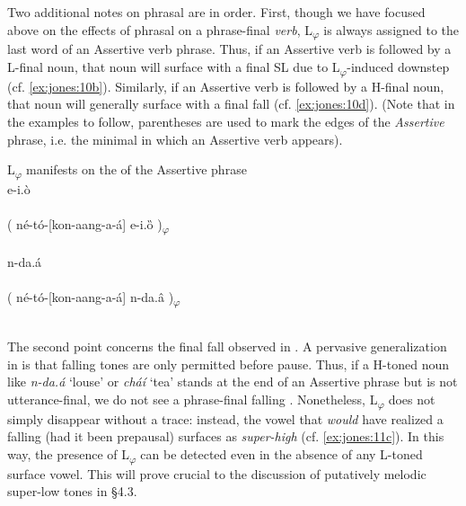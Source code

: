 \documentclass[output=paper
,newtxmath
,modfonts
,nonflat]{langsci/langscibook}
\begin{document}
Two additional notes on phrasal  are in order. First, though we have focused above on the effects of phrasal  on a phrase-final \textit{verb}, L\textsubscript{$\varphi $} is always assigned to the last word of an Assertive verb phrase. Thus, if an Assertive verb is followed by a L-final noun, that noun will surface with a final SL  due to L\textsubscript{$\varphi $}-induced downstep (cf. \ref{ex:jones:10b}). Similarly, if an Assertive verb is followed by a H-final noun, that noun will generally surface with a final fall (cf. \ref{ex:jones:10d}). (Note that in the examples to follow, parentheses are used to mark the edges of the \textit{Assertive} phrase, i.e. the minimal  in which an Assertive verb appears).

\ea\label{ex:jones:10}
{\label{bkm:Ref359198006}L\textsubscript{$\varphi $} manifests on the  of the Assertive phrase}\\
\ea\label{ex:jones:10a}
{e-i.ò} \\
\\
\ex\label{ex:jones:10b}
{\label{bkm:Ref359196744}( né-tó-[kon-aang-a-á] e-i.ȍ )\textsubscript{$\varphi $}} \\
\\
\ex\label{ex:jones:10c}
{n-da.á} \\
\\
\ex\label{ex:jones:10d}
{\label{bkm:Ref359196803}( né-tó-[kon-aang-a-á] n-da.â )\textsubscript{$\varphi $}} \\
\\
\z
\z

The second point concerns the final fall observed in . A pervasive generalization in  is that falling tones are only permitted before pause. Thus, if a H-toned noun like \textit{n-da.á} ‘louse’ or \textit{cháí} ‘tea’ stands at the end of an Assertive phrase but is not utterance-final, we do not see a phrase-final falling . Nonetheless, L\textsubscript{$\varphi $} does not simply disappear without a trace: instead, the vowel that \textit{would} have realized a falling  (had it been prepausal) surfaces as \textit{super-high} (cf. \ref{ex:jones:11c}). In this way, the presence of L\textsubscript{$\varphi $} can be detected even in the absence of any L-toned surface vowel. This will prove crucial to the discussion of putatively melodic super-low tones in §4.3.
\end{document}
